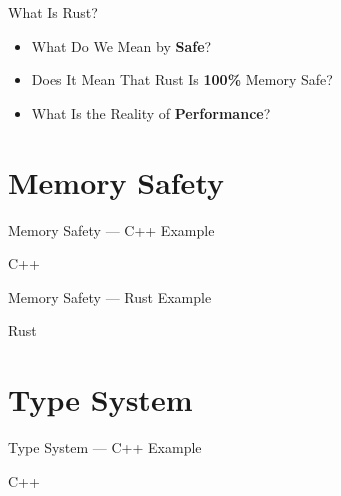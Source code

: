 \documentclass[10pt,aspectratio=169]{beamer}
\begin{document}
\begin{frame}{What Is Rust?}

\begin{itemize}
    \setlength\itemsep{4em}
    \item[] {\Large What Do We Mean by \textbf{Safe}?}
    \pause
    \item[]  {\Large Does It Mean That Rust Is \textbf{100\%} Memory Safe?}
    \pause
    \item[] {\Large What Is the Reality of \textbf{Performance}?}
\end{itemize}
\end{frame}

\section{Memory Safety}

\begin{frame}{Memory Safety --- C++ Example}
    \begin{block}{C++}        
        
    \end{block}
\end{frame}

\begin{frame}{Memory Safety --- Rust Example}
    
    \begin{block}{Rust}        
        
    \end{block}
\end{frame}

\section{Type System}

\begin{frame}{Type System --- C++ Example}
   \begin{block}{C++}        
        
    \end{block}
\end{frame}
\end{document}
